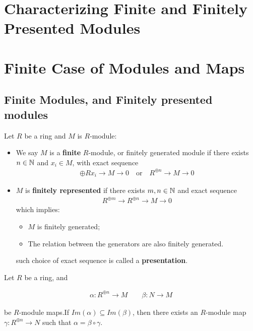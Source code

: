 \documentclass[Total.tex]{subfiles}
\begin{document}
		\section{Characterizing Finite and Finitely Presented Modules}
			
		\section{Finite Case of Modules and Maps}
			\subsection{Finite Modules, and Finitely presented modules}
		
			\begin{Def}
				Let $R$ be a ring and $M$ is $R$-module:
				
				\begin{itemize}
					\item We say $M$ is a \textbf{finite} $R$-module, or finitely generated module if there exists $n\in \mathbb{N}$ and $x_i\in M$, with exact sequence
					\begin{gather*}
						\oplus Rx_i\rightarrow M \rightarrow 0\quad\mbox{or}\quad R^{\oplus n}\rightarrow M\rightarrow 0
					\end{gather*}
					\item $M$ is \textbf{finitely represented} if there exists $m,n\in \mathbb{N}$ and exact sequence
					\begin{gather*}
						R^{\oplus m}\rightarrow R^{\oplus n}\rightarrow M\rightarrow 0
					\end{gather*}
					which implies:
					\begin{itemize}
						\item $M$ is finitely generated;
						\item The relation between the generators are also finitely generated.
					\end{itemize}
					such choice of exact sequence is called a \textbf{presentation}.
 				\end{itemize}
			\end{Def}
			
			\begin{lemma}
				Let $R$ be a ring, and 
				
				\begin{gather*}
					\alpha:R^{\oplus n}\rightarrow M\qquad \beta:N\rightarrow M
				\end{gather*}
				
				be $R$-module maps.If $Im(\alpha)\subseteq Im(\beta)$, then there exists an $R$-module map $\gamma:R^{\oplus n}\rightarrow N$ such that $\alpha=\beta\circ\gamma$.
				
				\begin{center}
				\end{center}
			\end{lemma}
			
\end{document}
